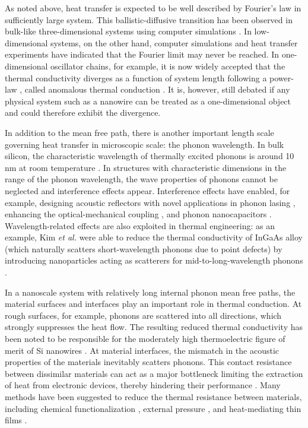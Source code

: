 As noted above, heat transfer is expected to be well described by Fourier's law in sufficiently large system. This ballistic-diffusive transition has been observed in bulk-like three-dimensional systems using computer simulations \cite{saito10}. In low-dimensional systems, on the other hand, computer simulations \cite{lepri97,lepri03,mai07,dhar08} and heat transfer experiments \cite{yang10,xu14} have indicated that the Fourier limit may never be reached. In one-dimensional oscillator chains, for example, it is now widely accepted \cite{dhar08} that the thermal conductivity diverges as a function of system length following a power-law \cite{mai07}, called anomalous thermal conduction \cite{dhar08}. It is, however, still debated \cite{marconnet13} if any physical system such as a nanowire can be treated as a one-dimensional object and could therefore exhibit the divergence.

In addition to the mean free path, there is another important length scale governing heat transfer in microscopic scale: the phonon wavelength. In bulk silicon, the characteristic wavelength of thermally excited phonons is around 10 nm at room temperature \cite{}. In structures with characteristic dimensions in the range of the phonon wavelength, the wave properties of phonons cannot be neglected and interference effects appear. Interference effects have enabled, for example, designing acoustic reflectors with novel applications in phonon lasing \cite{maryam13}, enhancing the optical-mechanical coupling \cite{fainstein13}, and phonon nanocapacitors \cite{han15}. Wavelength-related effects are also exploited in thermal engineering: as an example, Kim \textit{et al.} were able to reduce the thermal conductivity of InGaAs alloy (which naturally scatters short-wavelength phonons due to point defects) by introducing nanoparticles acting as scatterers for mid-to-long-wavelength phonons \cite{kim06}. %

In a nanoscale system with relatively long internal phonon mean free paths, the material surfaces and interfaces play an important role in thermal conduction. At rough surfaces, for example, phonons are scattered into all directions, which strongly suppresses the heat flow. The resulting reduced thermal conductivity has been noted to be responsible for the moderately high thermoelectric figure of merit of Si nanowires \cite{hochbaum08}. At material interfaces, the mismatch in the acoustic properties of the materials inevitably scatters phonons.  This contact resistance between dissimilar materials can act as a major bottleneck limiting the extraction of heat from electronic devices, thereby hindering their performance \cite{pop10}. Many methods have been suggested to reduce the thermal resistance between materials, including chemical functionalization \cite{hopkins11,kaur14}, external pressure \cite{shen11,chalopin12}, and heat-mediating thin films \cite{english12}. %

